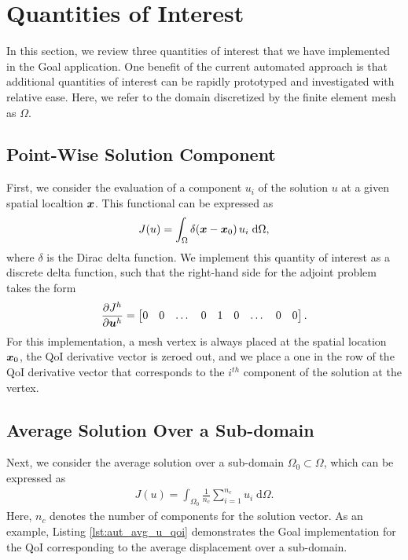 \section{Quantities of Interest}

In this section, we review three quantities of interest that we have
implemented in the Goal application. One benefit of the current automated
approach is that additional quantities of interest can be rapidly
prototyped and investigated with relative ease. Here, we refer to the
domain discretized by the finite element mesh as $\Omega$.

\subsection{Point-Wise Solution Component}

First, we consider the evaluation of a component $u_i$ of the solution $u$
at a given spatial localtion $\boldsymbol{x}$. This functional can be expressed as
%
\begin{gather}
J(u) = \int_{\Omega} \delta ( \boldsymbol{x} - \boldsymbol{x}_0 ) \, u_i
\; \text{d} \Omega,
\label{eq:aut_pw_qoi}
\end{gather}
%
where $\delta$ is the Dirac delta function. We implement this quantity of
interest as a discrete delta function, such that the right-hand side for
the adjoint problem takes the form
%
\begin{gather}
\frac{\partial J^h}{\partial \boldsymbol{u}^h} =
\begin{bmatrix}
0 & 0 & \dots & 0 & 1 & 0 & \dots & 0 & 0
\end{bmatrix}.
\label{eq:aut_discrete_delta}
\end{gather}
%
For this implementation, a mesh vertex is always placed at the spatial
location $\boldsymbol{x}_0$, the QoI derivative vector is zeroed out, and we place a
one in the row of the QoI derivative vector that corresponds to the $i^{th}$
component of the solution at the vertex.

\subsection{Average Solution Over a Sub-domain}

Next, we consider the average solution over a sub-domain
$\Omega_0 \subset \Omega$, which can be expressed as
%
\begin{gather}
J(u) = \int_{\Omega_0} \frac{1}{n_c} \sum_{i=1}^{n_c} u_i
\; \text{d} \Omega.
\label{eq:aut_avg_u_qoi}
\end{gather}
%
Here, $n_c$ denotes the number of components for the solution vector. As an
example, Listing \ref{lst:aut_avg_u_qoi} demonstrates the Goal implementation
for the QoI corresponding to the average displacement over a sub-domain.

